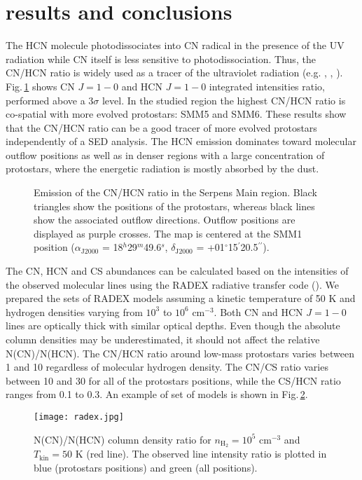 \documentclass[a4paper]{article}
\begin{document}
\section*{\sc results and conclusions}
\indent \indent The HCN molecule photodissociates into CN radical in the presence of the UV radiation while CN itself is less sensitive to photodissociation. Thus, the CN/HCN ratio is widely used as a tracer of the ultraviolet radiation (e.g. \cite{fuente1995},  \cite{chapillon2012}, \cite{riaz2018}). Fig.\,\ref{fig1} shows CN $J=1-0$ and HCN $J=1-0$ integrated intensities ratio, performed above a $3\sigma$ level. In the studied region the highest CN/HCN ratio is co-spatial with more evolved protostars: SMM5 and SMM6. These results show that the CN/HCN ratio can be a good tracer of more evolved protostars independently of a SED analysis. The HCN emission dominates toward molecular outflow positions as well as in denser regions with a large concentration of protostars, where the energetic radiation is mostly absorbed by the dust.

\begin{figure}[!h]
\centering
{}
\caption{Emission of the CN/HCN ratio in the Serpens Main region. Black triangles show the positions of the protostars, whereas black lines show the associated outflow directions. Outflow positions are displayed as purple crosses. The map is centered at the SMM1 position ($\alpha_\mathrm{J2000}$ = 18$^h$29$^m$49.6$^s$, $\delta_\mathrm{J2000}$ = +01$^{\circ}$15$^{\prime}$20.5$^{\prime\prime}$).}
\label{fig1}
\end{figure}

\indent \indent The CN, HCN and CS abundances can be calculated based on the intensities of the observed molecular lines using the RADEX radiative transfer code (\cite{tak2007}). We prepared the sets of RADEX models assuming a kinetic temperature of 50 K and hydrogen densities varying from $10^3$ to $10^6$ cm$^{-3}$. Both CN and HCN $J=1-0$ lines are optically thick with similar optical depths. Even though the absolute column densities may be underestimated, it should not affect the relative N(CN)/N(HCN). The CN/HCN ratio around low-mass protostars varies between 1 and 10 regardless of molecular hydrogen density. The CN/CS ratio varies between 10 and 30 for all of the protostars positions, while the CS/HCN ratio ranges from 0.1 to 0.3. An example of set of models is shown in Fig.\,\ref{fig2}.

\begin{figure}[!h]
\centering
\texttt{[image: radex.jpg]}
\caption{N(CN)/N(HCN) column density ratio for $n_\mathrm{H_2} = 10^5$ cm$^{-3}$ and $T_\mathrm{kin} = 50$ K (red line). The observed line intensity ratio is plotted in blue (protostars positions) and green (all positions).}\label{fig2}
\end{figure}
\end{document}
